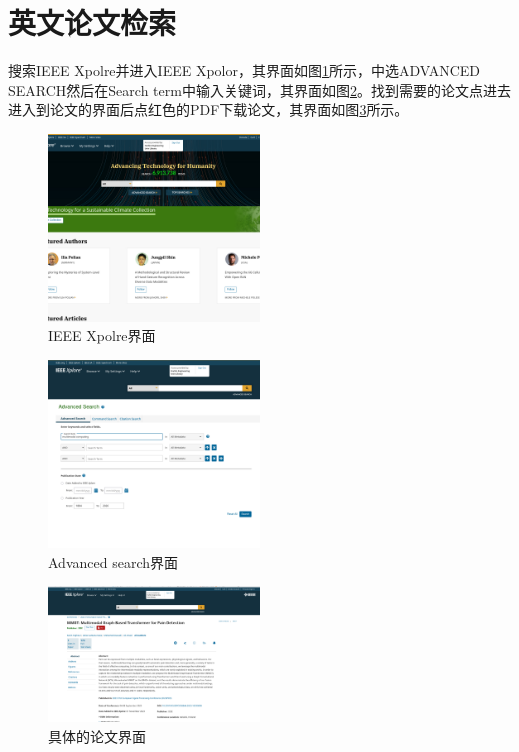 \section{英文论文检索}
搜索IEEE Xpolre并进入IEEE Xpolor，其界面如图\ref{fig_ieee_xpolor}所示，中选ADVANCED SEARCH然后在Search term中输入关键词，其界面如图\ref{adv_search}。找到需要的论文点进去进入到论文的界面后点红色的PDF下载论文，其界面如图\ref{the_papre}所示。

    \begin{figure}[H]
        \centering
        \includegraphics[width=0.5\textwidth]{./asserts/ieee_xpolre.png}
        \caption{IEEE Xpolre界面}
        \label{fig_ieee_xpolor}
    \end{figure}


    \begin{figure}[H]
        \centering
        \includegraphics[width=0.5\textwidth]{./asserts/en_search_multi_modal.png}
        \caption{Advanced search界面}
        \label{adv_search}
    \end{figure}

    \begin{figure}[H]
        \centering
        \includegraphics[width=0.5\textwidth]{./asserts/find_the_paper.png}
        \caption{具体的论文界面}
        \label{the_papre}
    \end{figure}






